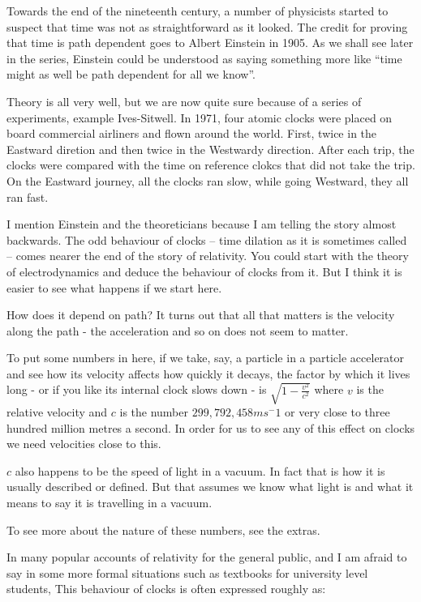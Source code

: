 \documentclass[a4paper]{report}
\begin{document}
Towards the end of the nineteenth century, a number of physicists started to suspect that time was not as straightforward as it looked. The credit for proving that time is path dependent goes to Albert Einstein in 1905. As we shall see later in the series, Einstein could be understood as saying something more like ``time might as well be path dependent for all we know''.

Theory is all very well, but we are now quite sure because of a series of experiments, example Ives-Sitwell. In 1971, four atomic clocks were placed on board commercial airliners and flown around the world. First, twice in the Eastward diretion and then twice in the Westwardy direction. After each trip, the clocks were compared with the time on reference clokcs that did not take the trip. On the Eastward journey, all the clocks ran slow, while going Westward, they all ran fast.

I mention Einstein and the theoreticians because I am telling the story almost backwards. The odd behaviour of clocks -- time dilation as it is sometimes called -- comes nearer the end of the story of relativity. You could start with the theory of electrodynamics and deduce the behaviour of clocks from it. But I think it is easier to see what happens if we start here. 

How does it depend on path? It turns out that all that matters is the velocity along the path - the acceleration and so on does not seem to matter.

To put some numbers in here, if we take, say, a particle in a particle accelerator and see how its velocity affects how quickly it decays, the factor by which it lives long - or if you like its internal clock slows down - is $\sqrt{1 - \frac{v^2}{c^2}}$ where $v$ is the relative velocity and $c$ is the number $299,792,458ms^-1$ or very close to three hundred million metres a second. In order for us to see any of this effect on clocks we need velocities close to this.

$c$ also happens to be the speed of light in a vacuum. In fact that is how it is usually described or defined. But that assumes we know what light is and what it means to say it is travelling in a vacuum. 

To see more about the nature of these numbers, see the extras.

In many popular accounts of relativity for the general public, and I am afraid to say in some more formal situations such as textbooks for university level students, This behaviour of clocks is often expressed roughly as:
\end{document}
